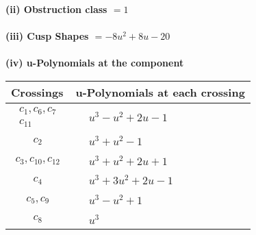 \documentclass[1p]{elsarticle_modified}
\theoremstyle{definition}
\begin{document}
\flushleft \textbf{(ii) Obstruction class $= 1$}\\~\\
\flushleft \textbf{(iii) Cusp Shapes $= -8 u^2+8 u-20$}\\~\\
\newpage\renewcommand{\arraystretch}{1}
\flushleft \textbf{(iv) u-Polynomials at the component}\newline \\
\begin{tabular}{m{50pt}|m{274pt}}
Crossings & \hspace{64pt}u-Polynomials at each crossing \\
\hline $$\begin{aligned}c_{1},c_{6},c_{7}\\c_{11}\end{aligned}$$&$\begin{aligned}
&u^3- u^2+2 u-1
\end{aligned}$\\
\hline $$\begin{aligned}c_{2}\end{aligned}$$&$\begin{aligned}
&u^3+u^2-1
\end{aligned}$\\
\hline $$\begin{aligned}c_{3},c_{10},c_{12}\end{aligned}$$&$\begin{aligned}
&u^3+u^2+2 u+1
\end{aligned}$\\
\hline $$\begin{aligned}c_{4}\end{aligned}$$&$\begin{aligned}
&u^3+3 u^2+2 u-1
\end{aligned}$\\
\hline $$\begin{aligned}c_{5},c_{9}\end{aligned}$$&$\begin{aligned}
&u^3- u^2+1
\end{aligned}$\\
\hline $$\begin{aligned}c_{8}\end{aligned}$$&$\begin{aligned}
&u^3
\end{aligned}$\\
\hline
\end{tabular}\\~\\
\end{document}
